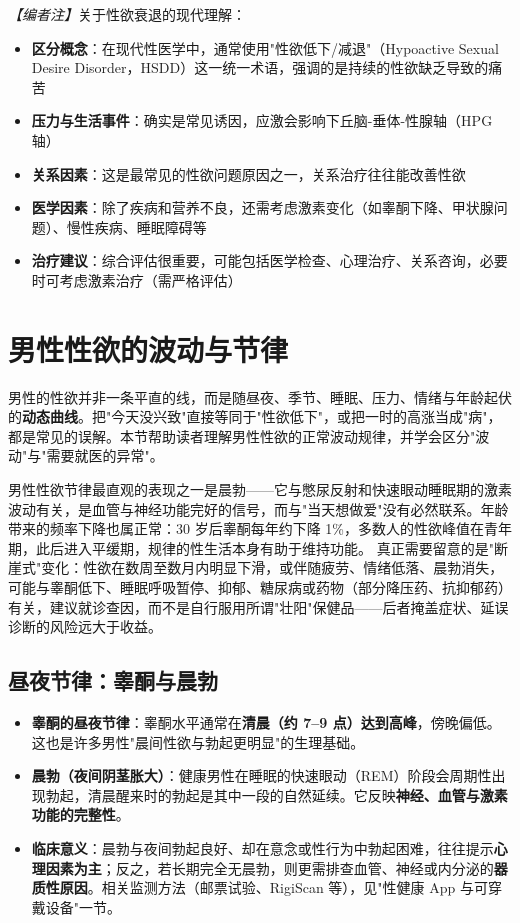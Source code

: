 \noindent\textit{【编者注】}关于性欲衰退的现代理解：
\begin{itemize}
	\item \textbf{区分概念}：在现代性医学中，通常使用"性欲低下/减退"（Hypoactive Sexual Desire Disorder，HSDD）这一统一术语，强调的是持续的性欲缺乏导致的痛苦
	\item \textbf{压力与生活事件}：确实是常见诱因，应激会影响下丘脑-垂体-性腺轴（HPG轴）
	\item \textbf{关系因素}：这是最常见的性欲问题原因之一，关系治疗往往能改善性欲
	\item \textbf{医学因素}：除了疾病和营养不良，还需考虑激素变化（如睾酮下降、甲状腺问题）、慢性疾病、睡眠障碍等
	\item \textbf{治疗建议}：综合评估很重要，可能包括医学检查、心理治疗、关系咨询，必要时可考虑激素治疗（需严格评估）
\end{itemize}

\section{男性性欲的波动与节律}

男性的性欲并非一条平直的线，而是随昼夜、季节、睡眠、压力、情绪与年龄起伏的\textbf{动态曲线}。把"今天没兴致"直接等同于"性欲低下"，或把一时的高涨当成"病"，都是常见的误解。本节帮助读者理解男性性欲的正常波动规律，并学会区分"波动"与"需要就医的异常"。


男性性欲节律最直观的表现之一是晨勃——它与憋尿反射和快速眼动睡眠期的激素波动有关，是血管与神经功能完好的信号，而与"当天想做爱"没有必然联系。年龄带来的频率下降也属正常：30 岁后睾酮每年约下降 1\%，多数人的性欲峰值在青年期，此后进入平缓期，规律的性生活本身有助于维持功能。
真正需要留意的是"断崖式"变化：性欲在数周至数月内明显下滑，或伴随疲劳、情绪低落、晨勃消失，可能与睾酮低下、睡眠呼吸暂停、抑郁、糖尿病或药物（部分降压药、抗抑郁药）有关，建议就诊查因，而不是自行服用所谓"壮阳"保健品——后者掩盖症状、延误诊断的风险远大于收益。

\subsection{昼夜节律：睾酮与晨勃}

\begin{itemize}
	\item \textbf{睾酮的昼夜节律}：睾酮水平通常在\textbf{清晨（约 7--9 点）达到高峰}，傍晚偏低。这也是许多男性"晨间性欲与勃起更明显"的生理基础。
	\item \textbf{晨勃（夜间阴茎胀大）}：健康男性在睡眠的快速眼动（REM）阶段会周期性出现勃起，清晨醒来时的勃起是其中一段的自然延续。它反映\textbf{神经、血管与激素功能的完整性}。
	\item \textbf{临床意义}：晨勃与夜间勃起良好、却在意念或性行为中勃起困难，往往提示\textbf{心理因素为主}；反之，若长期完全无晨勃，则更需排查血管、神经或内分泌的\textbf{器质性原因}。相关监测方法（邮票试验、RigiScan 等），见"性健康 App 与可穿戴设备"一节。
\end{itemize}

